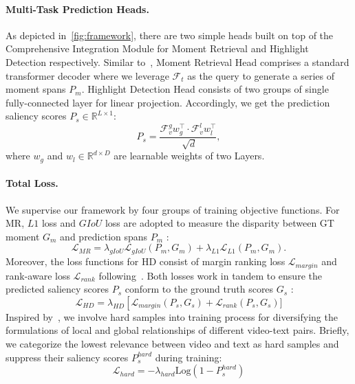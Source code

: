 \documentclass[10pt,twocolumn,letterpaper]{article}
\begin{document}
\paragraph{Multi-Task Prediction Heads.}
As depicted in~\cref{fig:framework}, there are two simple heads built on top of the Comprehensive Integration Module for Moment Retrieval and Highlight Detection respectively.
Similar to~\cite{momentdetr,qddetr,eatr}, Moment Retrieval Head comprises a standard transformer decoder where we leverage $\mathcal{F}_t$ as the query to generate a series of moment spans $P_m$.
Highlight Detection Head consists of two groups of single fully-connected layer for linear projection.
Accordingly, we get the prediction saliency scores $P_{s} \in \mathbb{R}^{L\times 1} $:
\begin{equation}
    P_s = \frac{\mathcal{F}_v^{g} w_g^{\top } \cdot\mathcal{F}_v^{l} w_l^{\top }}{\sqrt[]{d} },
\end{equation}
where $w_{g}$ and $w_{l} \in \mathbb{R}^{d\times D}$ are learnable weights of two Layers.

\paragraph{Total Loss.}
We supervise our framework by four groups of training objective functions.
For MR, $L1$ loss and $GIoU$ loss are adopted to measure the disparity between GT moment $G_m$ and prediction spans $P_m$ : 
\begin{equation}
    \mathcal{L}_{MR} = \lambda_{gIoU}\mathcal{L}_{gIoU}(P_m,G_m) + \lambda_{L1}\mathcal{L}_{L1}(P_m,G_m).
\end{equation}
Moreover, the loss functions for HD consist of margin ranking loss $\mathcal{L}_{margin}$ and rank-aware loss $\mathcal{L}_{rank}$ following~\cite{qddetr}. Both losses work in tandem to ensure the predicted saliency scores $P_s$ conform to the ground truth scores $G_s$ :
\begin{equation}
    \mathcal{L}_{HD} = \lambda_{HD}\left[\mathcal{L}_{margin}(P_s,G_s) + \mathcal{L}_{rank}(P_s,G_s)]\right.
\end{equation}
Inspired by~\cite{qddetr, dong2017}, we involve hard samples into training process for diversifying the formulations of local and global relationships of different video-text pairs. Briefly, we categorize the lowest relevance between video and text as hard samples and suppress their saliency scores $P_s^{hard}$ during training:   
\begin{equation}
    \mathcal{L}_{hard} = -\lambda_{hard}\mathrm{Log}(1-P_s^{hard})
\end{equation}
\end{document}
